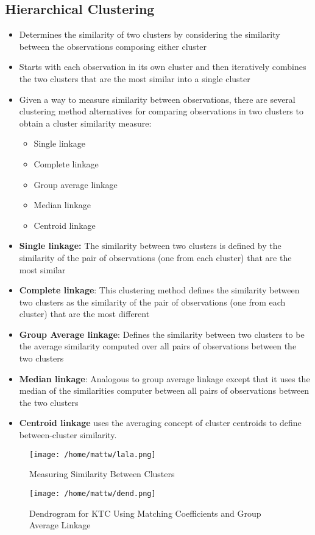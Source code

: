 \documentclass{report}
\begin{document}
\subsection{Hierarchical Clustering}
\begin{itemize}
  \item Determines the similarity of two clusters by considering the similarity between the observations composing either cluster
  \item Starts with each observation in its own cluster and then iteratively combines the two clusters that are the most similar into a single cluster
  \item Given a way to measure similarity between observations, there are several clustering method alternatives for comparing observations in two clusters to obtain a cluster similarity measure:
    \begin{itemize}[label=$\circ$]
    \item Single linkage 
    \item Complete linkage
    \item Group average linkage
    \item Median linkage
    \item Centroid linkage
  \end{itemize}
\end{itemize}
 \begin{itemize}
   \item \textbf{Single linkage:} The similarity between two clusters is defined by the similarity of the pair of observations (one from each cluster) that are the most similar
   \item \textbf{Complete linkage}: This clustering method defines the similarity between two clusters as the similarity of the pair of observations (one from each cluster) that are the most different
   \item \textbf{Group Average linkage}: Defines the similarity between two clusters to be the average similarity computed over all pairs of observations between the two clusters
   \item \textbf{Median linkage}: Analogous to group average linkage except that it uses the median of the similarities computer between all pairs of observations between the two clusters
   \item \textbf{Centroid linkage} uses the averaging concept of cluster centroids to define between-cluster similarity.
 \end{itemize} 
 \newpage
 \vspace*{\fill}\begin{figure}[ht]
    \centering
    \texttt{[image: /home/mattw/lala.png]}
    \caption{Measuring Similarity Between Clusters}
\end{figure}
\vspace*{\fill}
\clearpage
\vspace*{\fill}
\begin{figure}[ht]
    \centering
    \texttt{[image: /home/mattw/dend.png]}
    \caption{Dendrogram for KTC Using Matching Coefficients and Group Average Linkage}
\end{figure}
\vspace*{\fill}
\clearpage
\end{document}
